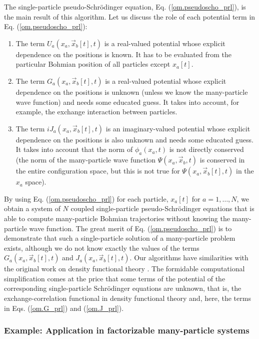 \documentclass[nofootinbib, secnumarabic, amsmath, nobibnotes,10pt,aps,pra]{revtex4-1}
\newcommand{\eref}[1]{Eq. (\ref{#1})}
\begin{document}
The single-particle pseudo-Schr\"odinger equation,
\eref{om.pseudoscho_prl}, is the main result of this algorithm. Let
us discuss the role of each potential term in
\eref{om.pseudoscho_prl}:
\begin{enumerate}
\item The term \textit{$U_{a}(x_{a},\vec x_{b}[t],t)$} is a real-valued potential whose explicit dependence on the positions is known. It has to be evaluated from the particular Bohmian position of all particles except $x_a[t]$.

\item The term \textit{$G_{a}(x_{a},\vec x_{b}[t],t)$} is a real-valued potential whose explicit dependence on the positions is unknown (unless we know the many-particle wave function) and needs some educated guess. It takes into account, for example, the exchange interaction between particles.

\item The term \textit{$i J_{a}(x_{a},\vec x_{b}[t],t)$} is an imaginary-valued potential whose explicit dependence on the positions is also unknown and needs some educated guess. It takes into account that the norm of $\phi_{a}(x_{a},t)$ is not directly conserved (the norm of the many-particle wave function $\Psi(x_a,\vec x_b,t)$ is conserved in the entire configuration space, but this is not true for $\Psi(x_a,\vec x_b[t],t)$ in the $x_a$ space).
\end{enumerate}

By using \eref{om.pseudoscho_prl} for each particle, $x_a[t]$ for $a = 1,\ldots,N$, we obtain a  system of $N$ coupled single-particle pseudo-Schr\"odinger equations that is able to compute many-particle Bohmian trajectories without knowing the many-particle wave function. The great merit of \eref{om.pseudoscho_prl} is to demonstrate that such a single-particle solution of a many-particle problem exists, although we do not know exactly the values of the terms $G_{a}(x_{a}, \vec x_{b}[t],t)$ and $J_{a}(x_{a},\vec x_{b}[t],t)$. Our algorithms have similarities with the original work on density functional theory \cite{om.kohn1964,om.kohn1965}. The formidable computational simplification comes at the price that some terms of the potential of the corresponding single-particle Schr\"odinger equations are unknown, that is, the exchange-correlation functional in density functional theory \cite{om.kohn1964,om.kohn1965} and, here, the terms in Eqs. (\ref{om.G_prl}) and (\ref{om.J_prl}).

\subsubsection{Example: Application in factorizable many-particle systems}
\end{document}
